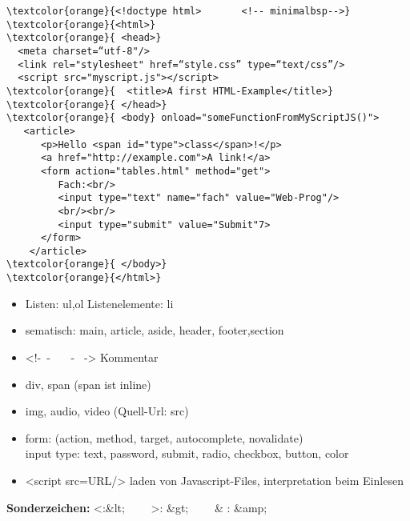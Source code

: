 \begin{Verbatim}[commandchars=\\\{\}]
\textcolor{orange}{<!doctype html>       <!-- minimalbsp-->}
\textcolor{orange}{<html>}
\textcolor{orange}{ <head>}
  <meta charset=“utf-8"/>
  <link rel="stylesheet" href=“style.css” type=“text/css”/>
  <script src="myscript.js"></script>
\textcolor{orange}{  <title>A first HTML-Example</title>}
\textcolor{orange}{ </head>}
\textcolor{orange}{ <body} onload="someFunctionFromMyScriptJS()">
   <article>
      <p>Hello <span id="type">class</span>!</p>
      <a href="http://example.com">A link!</a>
      <form action="tables.html" method="get">
         Fach:<br/>
         <input type="text" name="fach" value="Web-Prog"/>
         <br/><br/>
         <input type="submit" value="Submit"7>
      </form>
    </article>
\textcolor{orange}{ </body>}
\textcolor{orange}{</html>}
\end{Verbatim}

\begin{itemize}
\item Listen: ul,ol Listenelemente: li
\item sematisch: main, article, aside, header, footer,section
\item <!-~-~~~ -~ -> Kommentar
\item div, span  (span ist inline)
\item img, audio, video (Quell-Url: src)
\item form: (action, method, target, autocomplete, novalidate)\\
   input type: text, password, submit, radio, checkbox, button, color
  \item <script src=URL/> laden von Javascript-Files, interpretation beim Einlesen
\end{itemize}

\textbf{Sonderzeichen:} <:\&lt; ~~~~>: \&gt;  ~~~~\& : \&amp;

